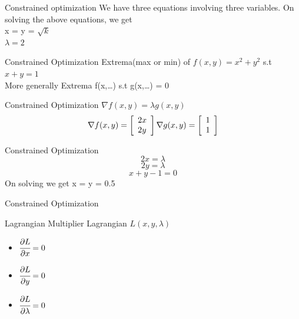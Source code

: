 \documentclass{beamer}
\begin{document}
\begin{frame}{Constrained optimization}
    We have three equations involving three variables. 
    On solving the above equations, we get\\
    x = y = $\sqrt{k}$\\
    $\lambda = 2$\\
\end{frame}

\begin{frame}{Constrained Optimization}
    Extrema(max or min) of $f(x,y) = x^{2} + y^{2}$ s.t $x + y = 1$\\
    
    \vspace{5em}
    More generally Extrema f(x,\dots) s.t g(x,\dots) = 0
\end{frame}

\begin{frame}{Constrained Optimization}
    $\nabla f(x,y) = \lambda g(x,y)$ \\
    \vspace{1em}
    $$
   \nabla f(x, y)=\left[\begin{array}{l}
   	{2 x} \\
   	{2 y}
   \end{array}\right] 
    \vspace{10em} 
    \nabla g(x, y)=\left[\begin{array}{l}
    	{1} \\
    	{1}
    \end{array}\right]
    $$
\end{frame}

\begin{frame}{Constrained Optimization}
    \begin{equation}
        2x=\lambda
    \end{equation}
    \begin{equation}
        2y=\lambda
    \end{equation}
    \begin{equation}
        x + y - 1 = 0
    \end{equation}
    On solving we get x = y = 0.5
\end{frame}

\begin{frame}{Constrained Optimization}

\end{frame}

\begin{frame}{Lagrangian Multiplier}
    Lagrangian $L(x,y,\lambda)$
    \begin{itemize}
        \item $\cfrac{\partial L}{\partial x} = 0$
        \item $\cfrac{\partial L}{\partial y} = 0$
        \item $\cfrac{\partial L}{\partial \lambda} = 0$
    \end{itemize}
    
\end{frame}
\end{document}
